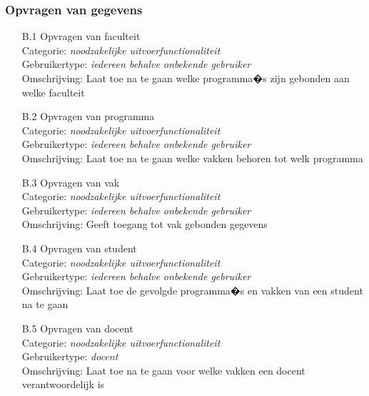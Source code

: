 \documentclass{article}
\begin{document}
\subsubsection{Opvragen van gegevens}
\begin{itemize}
\item[B.1] Opvragen van faculteit \\
Categorie: \textit{noodzakelijke uitvoerfunctionaliteit} \\
Gebruikertype: \textit{iedereen behalve onbekende gebruiker} \\
Omschrijving: Laat toe na te gaan welke programma�s zijn gebonden aan welke faculteit \\[-3mm]

\item[B.2] Opvragen van programma \\
Categorie: \textit{noodzakelijke uitvoerfunctionaliteit} \\
Gebruikertype: \textit{iedereen behalve onbekende gebruiker} \\
Omschrijving: Laat toe na te gaan welke vakken behoren tot welk programma \\[-3mm]

\item[B.3] Opvragen van vak \\
Categorie: \textit{noodzakelijke uitvoerfunctionaliteit} \\
Gebruikertype: \textit{iedereen behalve onbekende gebruiker} \\
Omschrijving: Geeft toegang tot vak gebonden gegevens \\[-3mm]

\item[B.4] Opvragen van student \\
Categorie: \textit{noodzakelijke uitvoerfunctionaliteit} \\
Gebruikertype: \textit{iedereen behalve onbekende gebruiker} \\
Omschrijving: Laat toe de gevolgde programma�s en vakken van een student na te gaan \\[-3mm]

\item[B.5] Opvragen van docent  \\
Categorie: \textit{noodzakelijke uitvoerfunctionaliteit} \\
Gebruikertype: \textit{docent} \\
Omschrijving: Laat toe na te gaan voor welke vakken een docent verantwoordelijk is \\[-3mm]


\end{itemize}
\end{document}
